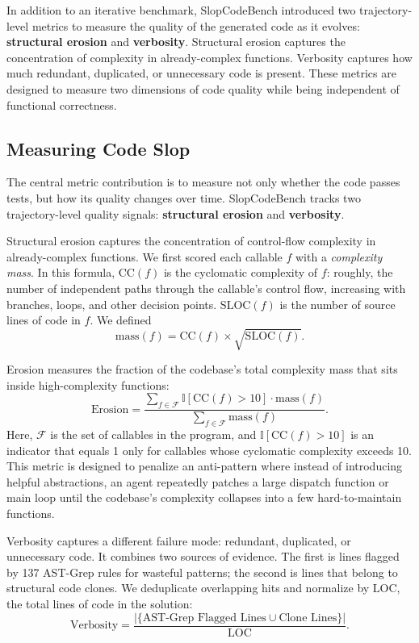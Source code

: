 In addition to an iterative benchmark, SlopCodeBench introduced two trajectory-level metrics to measure the quality of
the generated code as it evolves: \textbf{structural erosion} and \textbf{verbosity}.
Structural erosion captures the concentration of complexity in already-complex functions.
Verbosity captures how much redundant, duplicated, or unnecessary code is present.
These metrics are designed to measure two dimensions of code quality while being independent of
functional correctness.

\subsection{Measuring Code Slop}
The central metric contribution is to measure not only whether the code passes
tests, but how its quality changes over time. SlopCodeBench tracks two
trajectory-level quality signals: \textbf{structural erosion} and
\textbf{verbosity}.

Structural erosion captures the concentration of control-flow complexity in
already-complex functions. We first scored each callable $f$ with a
\emph{complexity mass}. In this formula, $\text{CC}(f)$ is the cyclomatic
complexity of $f$: roughly, the number of independent paths through the
callable's control flow, increasing with branches, loops, and other decision
points. $\text{SLOC}(f)$ is the number of source lines of code in $f$. We defined
\begin{equation*}
\label{eq:slopcodebench-mass}
\text{mass}(f) = \text{CC}(f) \times \sqrt{\text{SLOC}(f)}.
\end{equation*}

Erosion measures the fraction of the codebase's total complexity mass that sits
inside high-complexity functions:
\begin{equation}
\label{eq:slopcodebench-erosion}
\text{Erosion}
=
\frac{\sum_{f \in \mathcal{F}} \mathbb{I}[\text{CC}(f) > 10]\cdot\text{mass}(f)}
     {\sum_{f \in \mathcal{F}} \text{mass}(f)}.
\end{equation}
Here, $\mathcal{F}$ is the set of callables in the program, and
$\mathbb{I}[\text{CC}(f) > 10]$ is an indicator that equals 1 only for callables
whose cyclomatic complexity exceeds 10. This metric is designed to penalize an anti-pattern where
instead of introducing helpful abstractions, an agent repeatedly patches a large dispatch function
or main loop until the codebase's complexity collapses into a few hard-to-maintain functions.

Verbosity captures a different failure mode: redundant, duplicated, or
unnecessary code. It combines two sources of evidence. The first is lines
flagged by 137 AST-Grep rules for wasteful patterns; the second is lines that
belong to structural code clones. We deduplicate overlapping hits and normalize
by $\text{LOC}$, the total lines of code in the solution:
\begin{equation*}
\label{eq:slopcodebench-verbosity}
\text{Verbosity}
=
\frac{|\{\text{AST-Grep Flagged Lines} \cup \text{Clone Lines}\}|}
     {\text{LOC}}.
\end{equation*}

